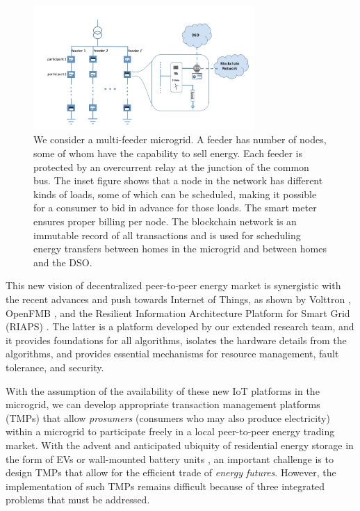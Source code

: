 \begin{figure}[t]
\centering
\vspace{-2.25em}
\includegraphics[width=0.75\textwidth]{diagrams/ProblemSetting}
\vspace{-1.25em}
\caption{We consider a multi-feeder microgrid. A feeder has number of nodes, some of whom have the capability to sell energy. Each feeder is protected by an overcurrent relay at the junction of the common bus. The inset figure shows that a node in the network has different kinds of loads, some of which can be scheduled, making it possible for a consumer to bid in advance for those loads. The smart meter ensures proper billing per node. The blockchain network is an immutable record of all transactions and is used for scheduling energy transfers between homes in the microgrid and between homes and the DSO.%
}
\label{fig:microgrid}
\end{figure}

This new vision of decentralized peer-to-peer energy market is synergistic with the recent advances and push towards Internet of Things, as shown by Volttron \cite{katipamula2016volttron},
OpenFMB \cite{gunthersmart}, and the Resilient Information
Architecture Platform for Smart Grid (RIAPS)
\cite{eisele2017riaps,Scott2017ICCPS}. The latter is a platform developed by our extended research team, and it provides foundations for all
algorithms, isolates the hardware details from the algorithms, and
provides essential mechanisms for resource management, fault
tolerance, and security.  

With the assumption of the availability of these new IoT platforms in the microgrid, we can develop appropriate transaction management platforms (TMPs) that allow  \emph{prosumers} (consumers who may also produce electricity) within a microgrid to participate freely in a local peer-to-peer energy trading market. With the advent and anticipated ubiquity of residential energy storage in the form of EVs or wall-mounted battery units \cite{Powerwall}, an important challenge is to design TMPs that allow for the efficient trade of \emph{energy futures}. However, the implementation of such TMPs remains difficult because of three integrated problems that must be addressed.



